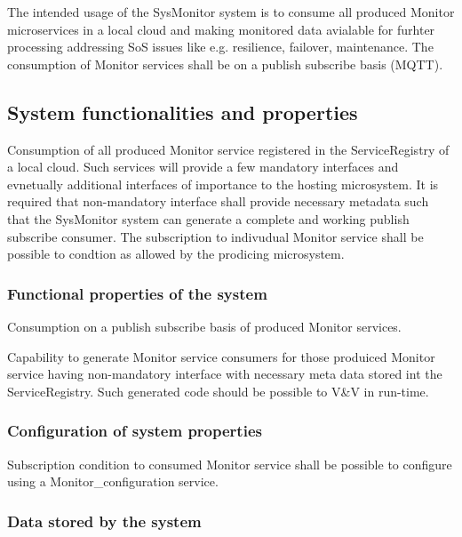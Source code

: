 \documentclass[a4paper]{arrowhead}
\begin{document}
The intended usage 
    of the SysMonitor system is to consume all produced Monitor
    microservices in a local cloud and making monitored data avialable
    for furhter processing addressing SoS issues like e.g. resilience,
    failover, maintenance. The consumption of Monitor services shall
    be on a publish subscribe basis (MQTT).  
    


\subsection{System functionalities and properties}
\label{sec:properties}

Consumption of all produced Monitor service registered in the
ServiceRegistry of a local cloud. Such
services will provide a few mandatory interfaces and evnetually
additional interfaces of importance to the hosting microsystem. It is
required that non-mandatory interface shall provide necessary metadata
such that the SysMonitor system can generate a complete and working publish subscribe
consumer. The subscription to indivudual Monitor service shall be
possible to condtion as allowed by the prodicing microsystem.




\subsubsection {Functional properties of the system}

Consumption on a publish subscribe basis of produced Monitor services.

Capability to generate Monitor service consumers for those produiced
Monitor service having non-mandatory interface with necessary meta
data stored int the ServiceRegistry. Such generated code should be
possible to V\&V in run-time.  


\subsubsection {Configuration of system properties}

Subscription condition to consumed Monitor service shall be possible
to configure using a Monitor\_configuration service.

\subsubsection {Data stored by the system}
\end{document}
